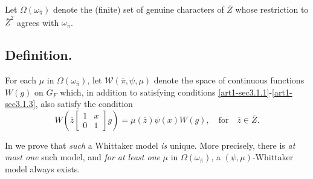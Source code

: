 Let $\Omega(\omega_{\overline{\pi}})$ denote the (finite) set of genuine characters of $\overline{Z}$ whose restriction to $\overline{Z}^{2}$ agrees with $\omega_{\overline{\pi}}$.

\subsection{Definition.}\label{art1-sec3.4}
For each $\mu$ in $\Omega(\omega_{\overline{\pi}})$, let $\mathscr{W}(\overline{\pi},\psi,\mu)$ denote the space of continuous functions $W(g)$ on $\overline{G}_{F}$ which, in addition to satisfying conditions \eqref{art1-sec3.1.1}-\eqref{art1-sec3.1.3}, also satisfy the condition
\setcounter{equation}{0}
\begin{equation}
W\left(\overline{z}\left[\begin{smallmatrix} 1 & x\\ 0 & 1 \end{smallmatrix}\right]g\right)=\mu(\overline{z})\psi(x)W(g),\quad\text{for}\quad \overline{z}\in \overline{Z}.\label{art1-eq3.4.1}
\end{equation}

In \cite{GeHPS} we prove that {\em such} a Whittaker model {\em is} unique. More precisely, there is {\em at most one} such model, and {\em for at least one} $\mu$ in $\Omega(\omega_{\overline{\pi}})$, a $(\psi,\mu)$-Whittaker model always exists.

